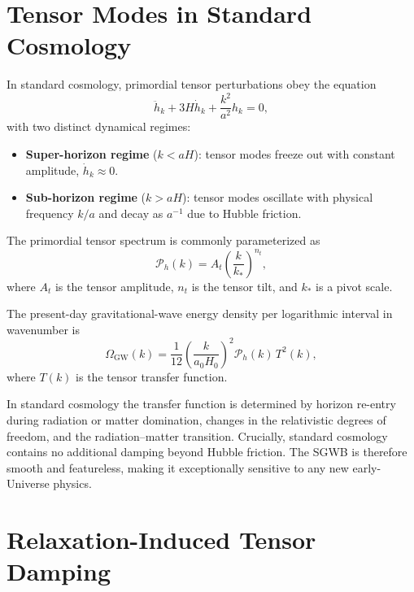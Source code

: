 \documentclass[11pt,a4paper]{article}
\begin{document}
\section{Tensor Modes in Standard Cosmology}

In standard cosmology, primordial tensor perturbations obey the equation
\begin{equation}
  \ddot{h}_{k} + 3H \dot{h}_{k} + \frac{k^{2}}{a^{2}} h_{k} = 0,
\end{equation}
with two distinct dynamical regimes:
\begin{itemize}
  \item \textbf{Super-horizon regime} (\(k < aH\)):
        tensor modes freeze out with constant amplitude,
        \(\dot{h}_{k}\approx 0\).
  \item \textbf{Sub-horizon regime} (\(k > aH\)):
        tensor modes oscillate with physical frequency \(k/a\) and decay
        as \(a^{-1}\) due to Hubble friction.
\end{itemize}

The primordial tensor spectrum is commonly parameterized as
\begin{equation}
  \mathcal{P}_{h}(k)
  =
  A_{t}
  \left(
    \frac{k}{k_{*}}
  \right)^{n_{t}},
\end{equation}
where \(A_{t}\) is the tensor amplitude, \(n_{t}\) is the tensor tilt, and
\(k_{*}\) is a pivot scale.

The present-day gravitational-wave energy density per logarithmic interval
in wavenumber is
\begin{equation}
  \Omega_{\mathrm{GW}}(k)
  =
  \frac{1}{12}
  \left(
    \frac{k}{a_{0} H_{0}}
  \right)^{2}
  \mathcal{P}_{h}(k)\, T^{2}(k),
\end{equation}
where \(T(k)\) is the tensor transfer function.

In standard cosmology the transfer function is determined by horizon
re-entry during radiation or matter domination, changes in the relativistic
degrees of freedom, and the radiation--matter transition. Crucially,
standard cosmology contains no additional damping beyond Hubble friction.
The SGWB is therefore smooth and featureless, making it exceptionally
sensitive to any new early-Universe physics.

\section{Relaxation-Induced Tensor Damping}
\end{document}
